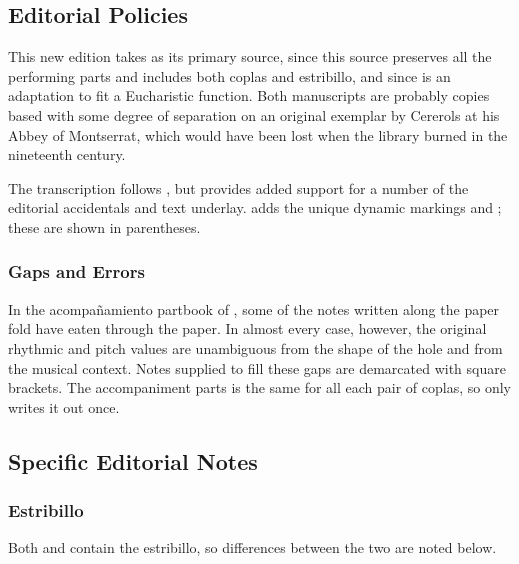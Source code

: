 
\subsection*{%
Editorial Policies
}

This new edition takes  as its primary source, since this source preserves all the performing parts and includes both coplas and estribillo, and since  is an adaptation to fit a Eucharistic function.
Both manuscripts are probably copies based with some degree of separation on an original exemplar by Cererols at his Abbey of Montserrat, which would have been lost when the library burned in the nineteenth century.

The transcription follows , but  provides added support for a number of the editorial  accidentals and text underlay.
 adds the unique dynamic markings  and ; these are shown in parentheses.

\subsubsection*{
Gaps and Errors
}

In the acompañamiento partbook of , some of the notes written along the paper fold have eaten through the paper. 
In almost every case, however, the original rhythmic and pitch values are unambiguous from the shape of the hole and from the musical context.
Notes supplied to fill these gaps are demarcated with square brackets.
The accompaniment parts is the same for all each pair of coplas, so  only writes it out once.

\subsection*{%
Specific Editorial Notes}

\subsubsection*{%
Estribillo}

Both  and  contain the estribillo, so differences between the two are noted below.

